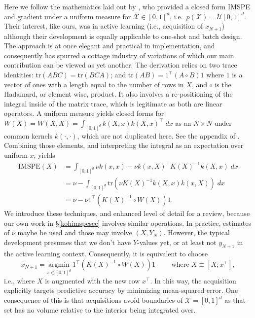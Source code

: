 \documentclass[
]{article}
\begin{document}
Here we follow the mathematics laid out by \citet{binois2019replication}, who
provided a closed form IMSPE and gradient under a uniform measure for
\(\mathcal{X} \in [0,1]^d\), i.e.~\(p(\mathcal{X}) = \mathcal{U} [0,1]^d\). Their interest, like ours, was in active learning (i.e., acquisition
of \(x_{N+1}\)) although their development is equally applicable to one-shot and
batch design. The approach is at once elegant and practical in implementation,
and consequently has spurred a cottage industry of variations
\citep{wycoff2021jcgs, cole2021locally, sauer2021active} of which our main contribution can be viewed as yet another.
The derivation relies on two trace identities: \(\mathrm{tr}(ABC) = \mathrm{tr}(BCA)\); and \(\mathrm{tr}(AB) = 1^\top (A \circ B)1\) where \(1\) is a vector of ones with
a length equal to the number of rows in \(X\), and \(\circ\) is the Hadamard, or element wise, product. It also involves a re-positioning of the integral inside of the
matrix trace, which is legitimate as both are linear operators. A uniform
measure yields closed forms for \(W(X) = W(X,X) = \int_{[0,1]^d} k(X,x) k(X,x)^\top \; dx\) as an \(N \times N\) under common kernels \(k(\cdot, \cdot)\),
which are not duplicated here. See the appendix of \citet{binois2019replication}. Combining those elements, and interpreting the integral as an expectation
over uniform \(x\), yields
\begin{equation}
\begin{split}
\mathrm{IMSPE}(X) &= \int_{[0,1]^d} \nu k(x,x) - \nu k(x,X)^\top K(X)^{-1}k(X,x) \; dx\\
&= \nu - \int_{[0,1]^d} \mathrm{tr}\left( \nu K(X)^{-1}  k(X,x) k(x,X) \right) \; dx\\
&= \nu - \nu 1^\top \left( K(X)^{-1} \circ W(X)  \right) 1.
\end{split}
\label{eq:imspe}
\end{equation}
We introduce these techniques, and enhanced level of detail for a review,
because our own work in \S \ref{kohimspesec} involves similar operations.
In practice, estimates of \(\nu\) maybe be used and those may involve \((X,Y_N)\). However, the typical development presumes
that we don't have \(Y\)-values yet, or at least not \(y_{N+1}\) in the
active learning context. Consequently, it is equivalent to choose
\begin{equation}
\tilde{x}_{N+1} = \underset{x \in [0,1]^d}{\mathrm{argmin}} \  1^\top \left( K(X)^{-1} \circ W(X)  \right) 1 \quad\quad \mbox{ where } X \equiv [X; x^\top],
\label{eq:minimspe}
\end{equation} i.e., where \(X\) is augmented with the new row \(x^\top\).
In this way, the acquisition explicitly targets predictive accuracy by
minimizing mean-squared error. One consequence of this is that
acquisitions avoid boundaries of \(\mathcal{X} = [0,1]^d\) as that
set has no volume relative to the interior being integrated over.
\end{document}
